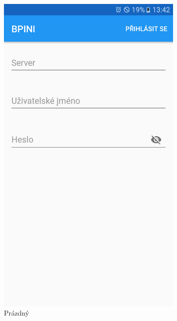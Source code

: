 \documentclass[12pt]{report}
\begin{document}
\begin{figure}[H]
	\centering
  \begin{subfigure}[b]{0.3\textwidth}
    \centering
	\includegraphics[width=\textwidth]{../images/client_android/Screenshot_20170610-134211.png}	
	\caption{Prázdný}
	\label{fig:Screenshot_20170610-134211}
  \end{subfigure}
  \begin{subfigure}[b]{0.3\textwidth}
    \centering

\end{subfigure}
\end{figure}
\end{document}
